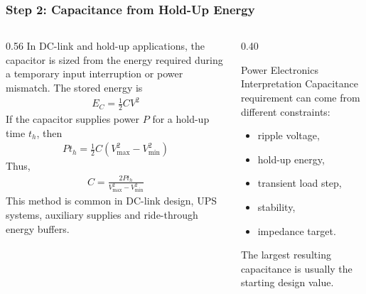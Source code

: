 \begin{frame}
\frametitle{Step 2: Capacitance from Hold-Up Energy}
\begin{columns}
\begin{column}{0.56\textwidth}
In DC-link and hold-up applications, the capacitor is sized from the energy required during a temporary input interruption or power mismatch. The stored energy is
\begin{align}
    E_C = \frac{1}{2}CV^2
\end{align}
If the capacitor supplies power \(P\) for a hold-up time \(t_h\), then
\begin{align}
    P t_h
    =
    \frac{1}{2}C
    \left(
    V_{\max}^2 - V_{\min}^2
    \right)
\end{align}
Thus,
\begin{align}
    C
    =
    \frac{2Pt_h}
    {V_{\max}^2 - V_{\min}^2}
\end{align}
This method is common in DC-link design, UPS systems, auxiliary supplies and ride-through energy buffers.
\end{column}

\begin{column}{0.40\textwidth}
\begin{block}{Power Electronics Interpretation}
\small
Capacitance requirement can come from different constraints:
\begin{itemize}
    \item ripple voltage,
    \item hold-up energy,
    \item transient load step,
    \item stability,
    \item impedance target.
\end{itemize}
The largest resulting capacitance is usually the starting design value.
\end{block}
\end{column}
\end{columns}

\end{frame}


